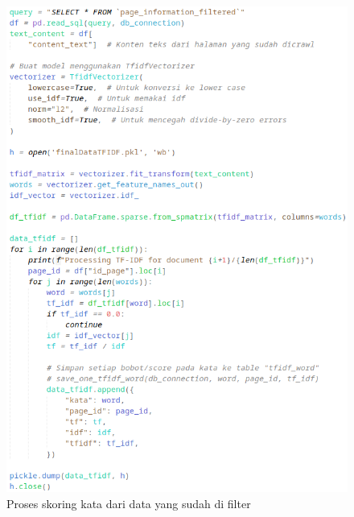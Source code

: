 \begin{figure}[H]
  \centering{}
	\includegraphics[width=\textwidth]{gambar/implementasi_generate_tfidf.png}
  \caption{Proses skoring kata dari data yang sudah di filter}
\end{figure}

